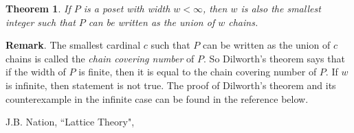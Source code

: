 \documentclass[12pt]{article}
\newtheorem*{thm}{Theorem}
\begin{document}
\begin{thm}  If $P$ is a poset with width $w<\infty$, then $w$ is also the smallest integer such that $P$ can be written as the union of $w$ chains.
\end{thm}

\textbf{Remark}.  The smallest cardinal $c$ such that $P$ can be written as the union of $c$ chains is called the \emph{chain covering number} of $P$.  So Dilworth's theorem says that if the width of $P$ is finite, then it is equal to the chain covering number of $P$.  If $w$ is infinite, then statement is not true.  The proof of Dilworth's theorem and its counterexample in the infinite case can be found in the reference below.

\begin{thebibliography}{6}
 J.B. Nation, ``Lattice Theory", 
\end{thebibliography}
\end{document}
